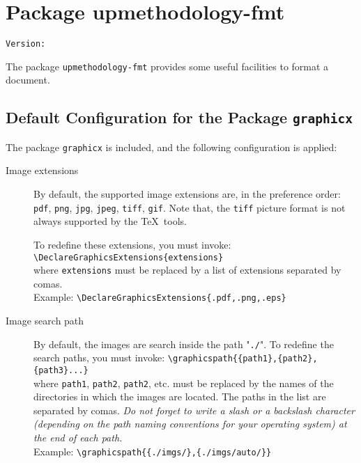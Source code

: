 \documentclass[book,taskpackage,specpackage,codepackage]{upmethodology-document}
\makeatletter
\let\VERfmt\upm@package@fmt@ver
\makeatother
\begin{document}

\chapter{Package upmethodology-fmt}

\begin{center}
	\texttt{Version: \VERfmt}
\end{center}

The package \texttt{upmethodology-fmt} provides some useful facilities to format a document.

\section{Default Configuration for the Package \texttt{graphicx}}

The package \texttt{graphicx} is included, and the following configuration is applied:
\begin{description}
\item[Image extensions] By default, the supported image extensions are, in the preference order: \texttt{pdf}, \texttt{png}, \texttt{jpg}, \texttt{jpeg}, \texttt{tiff}, \texttt{gif}. Note that, the \texttt{tiff} picture format is not always supported by the \TeX\ tools.

To redefine these extensions, you must invoke:\\
	\texttt{{\textbackslash}DeclareGraphicsExtensions\{extensions\}} \\
	where \texttt{extensions} must be replaced by a list of extensions separated by comas. \\
	Example: \texttt{{\textbackslash}DeclareGraphicsExtensions\{.pdf,.png,.eps\}} \\
\item[Image search path] By default, the images are search inside the path "\texttt{./}". To redefine the search paths, you must invoke:
	\texttt{{\textbackslash}graphicspath\{\{path1\},\{path2\},\{path3\}...\}} \\
	where \texttt{path1}, \texttt{path2}, \texttt{path2}, etc. must be replaced by the names of the directories in which the images are located. The paths in the list are separated by comas. \emph{Do not forget to write a slash or a backslash character (depending on the path naming conventions for your operating system) at the end of each path.} \\
	Example: \texttt{{\textbackslash}graphicspath\{\{./imgs/\},\{./imgs/auto/\}\}} \\
\end{description}
\end{document}
